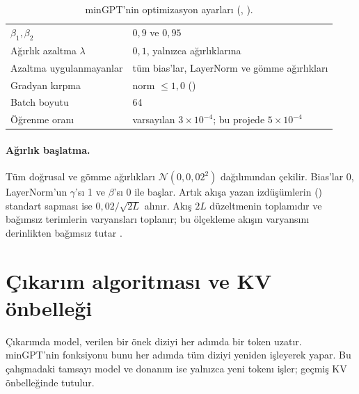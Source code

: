 \begin{table}[h]
  \centering\small
  \caption{minGPT'nin optimizasyon ayarları (, ).}
  \label{tab:adamw}
  \begin{tabularx}{0.85\textwidth}{@{}lL@{}}
    \toprule
     &  \\ \midrule
    $\beta_1, \beta_2$ & $0{,}9$ ve $0{,}95$ \\
    Ağırlık azaltma $\lambda$ & $0{,}1$, yalnızca  ağırlıklarına \\
    Azaltma uygulanmayanlar & tüm bias'lar, LayerNorm ve gömme ağırlıkları \\
    Gradyan kırpma & norm $\le 1{,}0$ () \\
    Batch boyutu & 64 \\
    Öğrenme oranı & varsayılan $3\times10^{-4}$; bu projede $5\times10^{-4}$ \\ \bottomrule
  \end{tabularx}
\end{table}

\paragraph{Ağırlık başlatma.} Tüm doğrusal ve gömme ağırlıkları $\mathcal{N}(0, 0{,}02^2)$ dağılımından çekilir. Bias'lar 0, LayerNorm'un $\gamma$'sı 1 ve $\beta$'sı 0 ile başlar. Artık akışa yazan izdüşümlerin () standart sapması ise $0{,}02/\sqrt{2L}$ alınır. Akış $2L$ düzeltmenin toplamıdır ve bağımsız terimlerin varyansları toplanır; bu ölçekleme akışın varyansını derinlikten bağımsız tutar \cite{radford19}.

\section{Çıkarım algoritması ve KV önbelleği}\label{sec:kv}

Çıkarımda model, verilen bir önek diziyi her adımda bir token uzatır. minGPT'nin  fonksiyonu bunu her adımda tüm diziyi yeniden işleyerek yapar. Bu çalışmadaki tamsayı model ve donanım ise yalnızca yeni tokenı işler; geçmiş KV önbelleğinde tutulur.

